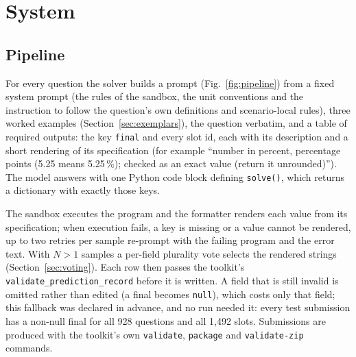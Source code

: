 \documentclass[conference]{IEEEtran}
\newcommand{\id}[1]{\texttt{#1}}
\begin{document}
\section{System}\label{sec:system}



\subsection{Pipeline}
For every question the solver builds a prompt (Fig.~\ref{fig:pipeline}) from a fixed system prompt (the rules of the sandbox, the unit conventions and the instruction to follow the question's own definitions and scenario-local rules), three worked examples (Section~\ref{sec:exemplars}), the question verbatim, and a table of required outputs: the key \id{final} and every slot id, each with its description and a short rendering of its specification (for example ``number in percent, percentage points (5.25 means 5.25\,\%); checked as an exact value (return it unrounded)''). The model answers with one Python code block defining \id{solve()}, which returns a dictionary with exactly those keys.

The sandbox executes the program and the formatter renders each value from its specification; when execution fails, a key is missing or a value cannot be rendered, up to two retries per sample re-prompt with the failing program and the error text. With $N>1$ samples a per-field plurality vote selects the rendered strings (Section~\ref{sec:voting}). Each row then passes the toolkit's \id{validate\_prediction\_record} before it is written. A field that is still invalid is omitted rather than edited (a final becomes \id{null}), which costs only that field; this fallback was declared in advance, and no run needed it: every test submission has a non-null final for all 928 questions and all 1,492 slots. Submissions are produced with the toolkit's own \id{validate}, \id{package} and \id{validate-zip} commands.
\end{document}
